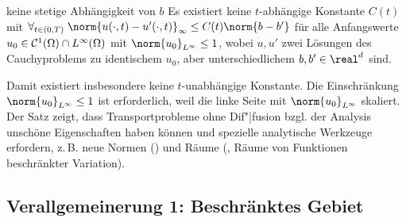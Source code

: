\linie

\begin{Satz}{keine stetige Abhängigkeit von $b$}
    Es existiert keine $t$-abhängige Konstante $C(t)$ mit
    $\forall_{t \in (0, T)}\;
    \norm{u(\cdot, t) - u'(\cdot, t)}_\infty \le C(t) \norm{b - b'}$
    für alle Anfangswerte $u_0 \in \mathcal{C}^1(\Omega) \cap L^\infty(\Omega)$ mit
    $\norm{u_0}_{L^\infty} \le 1$,
    wobei $u, u'$ zwei Lösungen des Cauchyproblems zu identischem $u_0$, aber unterschiedlichem
    $b, b' \in \real^d$ sind.
\end{Satz}

\begin{Bem}
    Damit existiert insbesondere keine $t$-unabhängige Konstante.
    Die Einschränkung $\norm{u_0}_{L^\infty} \le 1$ ist erforderlich, weil die linke Seite mit
    $\norm{u_0}_{L^\infty}$ skaliert.
    Der Satz zeigt, dass Transportprobleme ohne Dif"|fusion bzgl. der Analysis unschöne
    Eigenschaften haben können und spezielle analytische Werkzeuge erfordern,
    z.\,B. neue Normen () und Räume (,
    Räume von Funktionen beschränkter Variation).
\end{Bem}

\subsection{%
    Verallgemeinerung 1: Beschränktes Gebiet%
}

